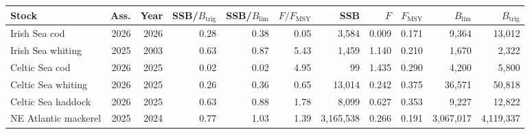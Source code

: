 \begin{tabular}{@{}lrrrrrrrrrr@{}}
\toprule
Stock & Ass. & Year & SSB/$B_{\mathrm{trig}}$ & SSB/$B_{\lim}$ & $F/F_{\mathrm{MSY}}$ & SSB & $F$ & $F_{\mathrm{MSY}}$ & $B_{\lim}$ & $B_{\mathrm{trig}}$ \\
\midrule
Irish Sea cod & 2026 & 2026 & \cellcolor{red!25}0.28 & \cellcolor{red!25}0.38 & \cellcolor{green!25}0.05 & \cellcolor{red!25}3,584 & \cellcolor{green!25}0.009 & 0.171 & 9,364 & 13,012 \\
Irish Sea whiting & 2025 & 2003 & \cellcolor{red!25}0.63 & \cellcolor{red!25}0.87 & \cellcolor{red!25}5.43 & \cellcolor{red!25}1,459 & \cellcolor{red!25}1.140 & 0.210 & 1,670 & 2,322 \\
Celtic Sea cod & 2026 & 2025 & \cellcolor{red!25}0.02 & \cellcolor{red!25}0.02 & \cellcolor{red!25}4.95 & \cellcolor{red!25}99 & \cellcolor{red!25}1.435 & 0.290 & 4,200 & 5,800 \\
Celtic Sea whiting & 2026 & 2025 & \cellcolor{red!25}0.26 & \cellcolor{red!25}0.36 & \cellcolor{green!25}0.65 & \cellcolor{red!25}13,014 & \cellcolor{green!25}0.242 & 0.375 & 36,571 & 50,818 \\
Celtic Sea haddock & 2026 & 2025 & \cellcolor{red!25}0.63 & \cellcolor{red!25}0.88 & \cellcolor{red!25}1.78 & \cellcolor{red!25}8,099 & \cellcolor{red!25}0.627 & 0.353 & 9,227 & 12,822 \\
NE Atlantic mackerel & 2025 & 2024 & \cellcolor{orange!25}0.77 & \cellcolor{orange!25}1.03 & \cellcolor{red!25}1.39 & \cellcolor{orange!25}3,165,538 & \cellcolor{red!25}0.266 & 0.191 & 3,067,017 & 4,119,337 \\
\bottomrule
\end{tabular}
